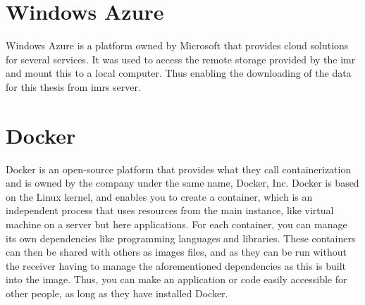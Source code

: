               


    \section{Windows Azure} \label{Windows Azure}
        Windows Azure \cite{azure} is a platform owned by Microsoft that provides cloud solutions for several services. It was used to access the remote storage provided by the \gls{imr} and mount this to a local computer. Thus enabling the downloading of the data for this thesis from \gls{imr}s server. 
    
    \section{Docker} \label{Docker}
        Docker \cite{docker} is an open-source platform that provides what they call containerization and is owned by the company under the same name, Docker, Inc. Docker is based on the Linux kernel, and enables you to create a container, which is an independent process that uses resources from the main instance, like virtual machine on a server but here applications. For each container, you can manage its own dependencies like programming languages and libraries. These containers can then be shared with others as images files, and as they can be run without the receiver having to manage the aforementioned dependencies as this is built into the image. Thus, you can make an application or code easily accessible for other people, as long as they have installed Docker.
        
